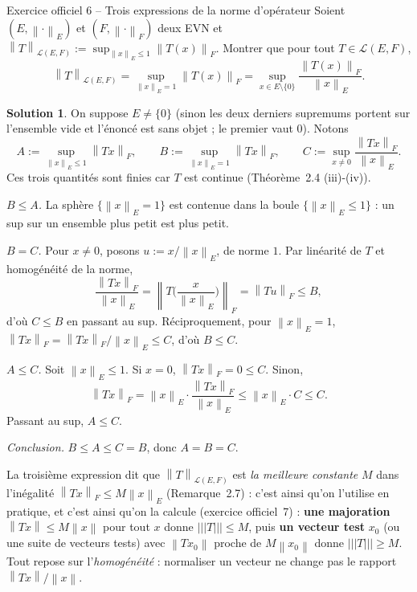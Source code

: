 \documentclass[11pt,a4paper]{article}
\newcommand{\norm}[1]{\left\|#1\right\|}
\newcommand{\opnorm}[1]{|\!|\!|#1|\!|\!|}
\newcommand{\Lc}{\mathcal{L}}
\theoremstyle{definition}
\newtheorem*{solution}{Solution}
\begin{document}
\begin{exo}{Exercice officiel 6 -- Trois expressions de la norme d'opérateur}
Soient $(E,\norm\cdot_E)$ et $(F,\norm\cdot_F)$ deux EVN et $\norm T_{\Lc(E,F)}:=\sup_{\norm x_E\le1}\norm{T(x)}_F$. Montrer que pour tout $T\in\Lc(E,F)$,
\[
\norm T_{\Lc(E,F)}=\sup_{\norm x_E=1}\norm{T(x)}_F=\sup_{x\in E\setminus\{0\}}\frac{\norm{T(x)}_F}{\norm x_E}.
\]
\end{exo}

\begin{solution}
On suppose $E\ne\{0\}$ (sinon les deux derniers supremums portent sur l'ensemble vide et l'énoncé est sans objet ; le premier vaut $0$). Notons
\[
A:=\sup_{\norm x_E\le1}\norm{Tx}_F,\qquad B:=\sup_{\norm x_E=1}\norm{Tx}_F,\qquad C:=\sup_{x\ne0}\frac{\norm{Tx}_F}{\norm x_E}.
\]
Ces trois quantités sont finies car $T$ est continue (Théorème~2.4 (iii)-(iv)).

\emph{$B\le A$.} La sphère $\{\norm x_E=1\}$ est contenue dans la boule $\{\norm x_E\le1\}$ : un sup sur un ensemble plus petit est plus petit.

\emph{$B=C$.} Pour $x\ne0$, posons $u:=x/\norm x_E$, de norme $1$. Par linéarité de $T$ et homogénéité de la norme,
\[
\frac{\norm{Tx}_F}{\norm x_E}=\norm{T\Big(\frac{x}{\norm x_E}\Big)}_F=\norm{Tu}_F\le B ,
\]
d'où $C\le B$ en passant au sup. Réciproquement, pour $\norm x_E=1$, $\norm{Tx}_F=\norm{Tx}_F/\norm x_E\le C$, d'où $B\le C$.

\emph{$A\le C$.} Soit $\norm x_E\le1$. Si $x=0$, $\norm{Tx}_F=0\le C$. Sinon,
\[
\norm{Tx}_F=\norm x_E\cdot\frac{\norm{Tx}_F}{\norm x_E}\le\norm x_E\cdot C\le C .
\]
Passant au sup, $A\le C$.

\emph{Conclusion.} $B\le A\le C=B$, donc $A=B=C$.
\end{solution}

\begin{pointcle}
La troisième expression dit que $\norm T_{\Lc(E,F)}$ est \emph{la meilleure constante} $M$ dans l'inégalité $\norm{Tx}_F\le M\norm x_E$ (Remarque~2.7) : c'est ainsi qu'on l'utilise en pratique, et c'est ainsi qu'on la calcule (exercice officiel~7) : \textbf{une majoration} $\norm{Tx}\le M\norm x$ pour tout $x$ donne $\opnorm T\le M$, puis \textbf{un vecteur test} $x_0$ (ou une suite de vecteurs tests) avec $\norm{Tx_0}$ proche de $M\norm{x_0}$ donne $\opnorm T\ge M$. Tout repose sur l'\emph{homogénéité} : normaliser un vecteur ne change pas le rapport $\norm{Tx}/\norm x$.
\end{pointcle}
\end{document}
